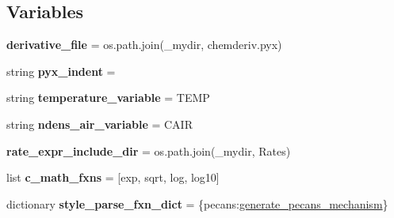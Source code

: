 \subsection*{Variables}
\begin{DoxyCompactItemize}
\item 
{\bfseries derivative\+\_\+file} = os.\+path.\+join(\+\_\+mydir, \textquotesingle{}chemderiv.\+pyx\textquotesingle{})\hypertarget{namespacepecans_1_1mechgen_ad3768d39ff17a98fe5557dd8c5cc5906}{}\label{namespacepecans_1_1mechgen_ad3768d39ff17a98fe5557dd8c5cc5906}

\item 
string {\bfseries pyx\+\_\+indent} = \textquotesingle{} \textquotesingle{}\hypertarget{namespacepecans_1_1mechgen_a107402f8c195fb2e8890ed47f2dae3ae}{}\label{namespacepecans_1_1mechgen_a107402f8c195fb2e8890ed47f2dae3ae}

\item 
string {\bfseries temperature\+\_\+variable} = \textquotesingle{}T\+E\+MP\textquotesingle{}\hypertarget{namespacepecans_1_1mechgen_a44fbe59fd0452f44bb22af2fc8b743f4}{}\label{namespacepecans_1_1mechgen_a44fbe59fd0452f44bb22af2fc8b743f4}

\item 
string {\bfseries ndens\+\_\+air\+\_\+variable} = \textquotesingle{}C\+A\+IR\textquotesingle{}\hypertarget{namespacepecans_1_1mechgen_a3532815164cb3268406c9dbba06c8a77}{}\label{namespacepecans_1_1mechgen_a3532815164cb3268406c9dbba06c8a77}

\item 
{\bfseries rate\+\_\+expr\+\_\+include\+\_\+dir} = os.\+path.\+join(\+\_\+mydir, \textquotesingle{}Rates\textquotesingle{})\hypertarget{namespacepecans_1_1mechgen_a6f056fe0002af4ffb0420ea33aea4922}{}\label{namespacepecans_1_1mechgen_a6f056fe0002af4ffb0420ea33aea4922}

\item 
list {\bfseries c\+\_\+math\+\_\+fxns} = \mbox{[}\textquotesingle{}exp\textquotesingle{}, \textquotesingle{}sqrt\textquotesingle{}, \textquotesingle{}log\textquotesingle{}, \textquotesingle{}log10\textquotesingle{}\mbox{]}\hypertarget{namespacepecans_1_1mechgen_a4b2dfbb7822ac276236b377b13d58a5c}{}\label{namespacepecans_1_1mechgen_a4b2dfbb7822ac276236b377b13d58a5c}

\item 
dictionary {\bfseries style\+\_\+parse\+\_\+fxn\+\_\+dict} = \{\textquotesingle{}pecans\textquotesingle{}\+:\hyperlink{namespacepecans_1_1mechgen_a998050ad09f27de979fff1102f144e9b}{generate\+\_\+pecans\+\_\+mechanism}\}\hypertarget{namespacepecans_1_1mechgen_ac68d24dbdb0124e04d8d7d268711289c}{}\label{namespacepecans_1_1mechgen_ac68d24dbdb0124e04d8d7d268711289c}

\end{DoxyCompactItemize}


